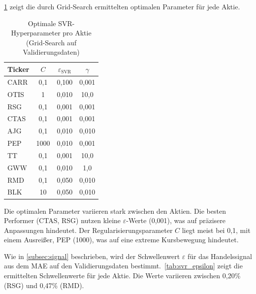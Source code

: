 \cref{tab:svr_hyperparams} zeigt die durch Grid-Search ermittelten optimalen Parameter für jede Aktie.

\begin{table}[htbp]
    \centering
    \begin{tabular}{l c c c}
        \toprule
        Ticker & $C$  & $\varepsilon_{\text{SVR}}$ & $\gamma$ \\
        \midrule
        CARR   & 0,1  & 0,100                      & 0,001    \\
        OTIS   & 1    & 0,010                      & 10,0     \\
        RSG    & 0,1  & 0,001                      & 0,001    \\
        CTAS   & 0,1  & 0,001                      & 0,001    \\
        AJG    & 0,1  & 0,010                      & 0,010    \\
        PEP    & 1000 & 0,010                      & 0,001    \\
        TT     & 0,1  & 0,001                      & 10,0     \\
        GWW    & 0,1  & 0,010                      & 1,0      \\
        RMD    & 0,1  & 0,050                      & 0,010    \\
        BLK    & 10   & 0,050                      & 0,010    \\
        \bottomrule
    \end{tabular}
    \caption{Optimale SVR-Hyperparameter pro Aktie (Grid-Search auf Validierungsdaten)}\label{tab:svr_hyperparams}
\end{table}

Die optimalen Parameter variieren stark zwischen den Aktien. Die besten Performer (CTAS, RSG) nutzen kleine $\varepsilon$-Werte (0,001), was auf präzisere Anpassungen hindeutet. Der Regularisierungsparameter $C$ liegt meist bei 0,1, mit einem Ausreißer, PEP (1000), was auf eine extreme Kursbewegung hindeutet.

Wie in \cref{subsec:signal} beschrieben, wird der Schwellenwert $\varepsilon$ für das Handelssignal aus dem \ac{MAE} auf den Validierungsdaten bestimmt.~\cref{tab:svr_epsilon} zeigt die ermittelten Schwellenwerte für jede Aktie. Die Werte variieren zwischen 0,20\% (RSG) und 0,47\% (RMD).

